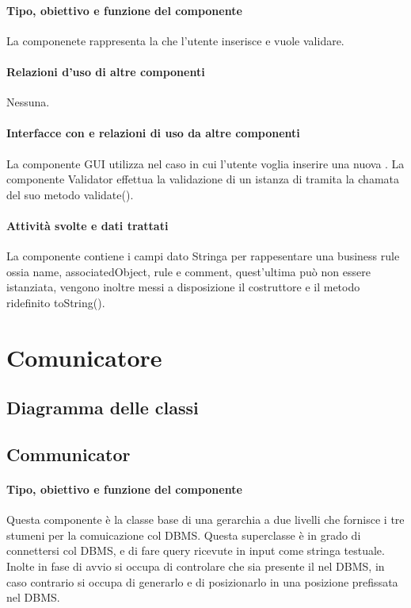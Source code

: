 \documentclass[11pt,titlepage,a4paper]{report}
\begin{document}
\paragraph{Tipo, obiettivo e funzione del componente}
La componenete \BR rappresenta la \br che l'utente inserisce e vuole validare.
\paragraph{Relazioni d'uso di altre componenti}
Nessuna.
\paragraph{Interfacce con e relazioni di uso da altre componenti}
La componente GUI utilizza \BR nel caso in cui l'utente voglia inserire una nuova \br.
La componente Validator effettua la validazione di un istanza di \BR tramita la chamata del suo metodo validate().
\paragraph{Attivit\`a svolte e dati trattati}
La componente contiene i campi dato Stringa per rappesentare una business rule ossia name, associatedObject, rule e comment, quest'ultima può non essere istanziata, vengono inoltre messi a disposizione il costruttore e il metodo ridefinito toString().

\section{Comunicatore}
\subsection{Diagramma delle classi}
\subsection{Communicator}
\paragraph{Tipo, obiettivo e funzione del componente}
Questa componente è la classe base di una gerarchia a due livelli che fornisce i tre stumeni per la comuicazione col DBMS. Questa superclasse \`e in grado di connettersi col DBMS, e di fare query ricevute in input come stringa testuale.
Inolte in fase di avvio si occupa di controlare che sia presente il \re nel DBMS, in caso contrario si occupa di generarlo e di posizionarlo in una posizione prefissata nel DBMS.
\end{document}

